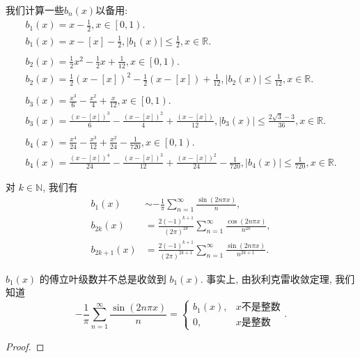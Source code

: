 \documentclass[../../main.tex]{subfiles}%
\begin{document}
\begin{conclusion}\label{conclusion:b_n(x)的初等表达式}
我们计算一些$b_n(x)$以备用:
\begin{gather*}
b_1\left( x \right) =x-\frac{1}{2},x\in \left[ 0,1 \right) .
\\
b_1\left( x \right) =x-\left[ x \right] -\frac{1}{2},\left| b_1\left( x \right) \right|\leqslant \frac{1}{2},x\in \mathbb{R} .
\\
\\
b_2\left( x \right) =\frac{1}{2}x^2-\frac{1}{2}x+\frac{1}{12},x\in \left[ 0,1 \right) .
\\
b_2\left( x \right) =\frac{1}{2}\left( x-\left[ x \right] \right) ^2-\frac{1}{2}\left( x-\left[ x \right] \right) +\frac{1}{12},\left| b_2\left( x \right) \right|\leqslant \frac{1}{12},x\in \mathbb{R} .
\\
\\
b_3\left( x \right) =\frac{x^3}{6}-\frac{x^2}{4}+\frac{x}{12},x\in \left[ 0,1 \right) .
\\
b_3\left( x \right) =\frac{\left( x-\left[ x \right] \right) ^3}{6}-\frac{\left( x-\left[ x \right] \right) ^2}{4}+\frac{\left( x-\left[ x \right] \right)}{12},\left| b_3\left( x \right) \right|\leqslant \frac{2\sqrt{3}-3}{36},x\in \mathbb{R} .
\\
\\
b_4\left( x \right) =\frac{x^4}{24}-\frac{x^3}{12}+\frac{x^2}{24}-\frac{1}{720},x\in \left[ 0,1 \right) .
\\
b_4\left( x \right) =\frac{\left( x-\left[ x \right] \right) ^4}{24}-\frac{\left( x-\left[ x \right] \right) ^3}{12}+\frac{\left( x-\left[ x \right] \right) ^2}{24}-\frac{1}{720},\left| b_4\left( x \right) \right|\leqslant \frac{1}{720},x\in \mathbb{R} .
\end{gather*}
\end{conclusion}

\begin{proposition}[$b_n(x)$ 的傅立叶级数表达式]
对 $k \in \mathbb{N}$, 我们有
\begin{align*}
b_1(x) &\sim -\frac{1}{\pi} \sum\limits_{n=1}^\infty \frac{\sin(2n\pi x)}{n}, \\
b_{2k}(x) &= \frac{2(-1)^{k+1}}{(2\pi)^{2k}} \sum\limits_{n=1}^\infty \frac{\cos(2n\pi x)}{n^{2k}}, \\
b_{2k+1}(x) &= \frac{2(-1)^{k+1}}{(2\pi)^{2k+1}} \sum\limits_{n=1}^\infty \frac{\sin(2n\pi x)}{n^{2k+1}}.
\end{align*}
\end{proposition}
\begin{remark}
$b_1(x)$ 的傅立叶级数并不总是收敛到 $b_1(x)$. 事实上, 由狄利克雷收敛定理, 我们知道
$$-\frac{1}{\pi} \sum\limits_{n=1}^\infty \frac{\sin(2n\pi x)}{n} = \begin{cases} 
b_1(x), & x \text{不是整数} \\
0, & x \text{是整数} 
\end{cases}.$$
\end{remark}
\begin{proof}



\end{proof}
\end{document}
